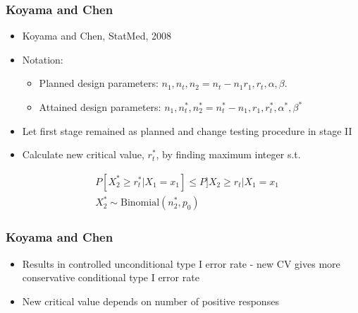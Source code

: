 \documentclass{beamer}\usepackage[]{graphicx}\usepackage[]{color}
\begin{document}
\begin{frame}
\frametitle{Koyama and Chen}
    \begin{itemize}
        \item Koyama and Chen, StatMed, 2008
        \item Notation: 
          \begin{itemize}
            \item Planned design parameters: $n_1, n_t, n_2 = n_t - n_1 r_1, r_t, \alpha, \beta$. 
            \item Attained design parameters: $n_1, n_t^\ast, n_2^\ast = n_t^\ast - n_1, r_1, r_t^\ast, \alpha^\ast, \beta^\ast$  
          \end{itemize}
        \item Let first stage remained as planned and change testing procedure in stage II%
        \item Calculate new critical value, $r_t^\ast$, by finding maximum integer s.t. 
    \end{itemize}
    \begin{equation*}
    \begin{aligned}
    &P[X_2^\ast \geq r_t^\ast \vert X_1 = x_1] \leq P]X_2 \geq r_t \vert X_1 = x_1\\
    &X_2^\ast \sim \mbox{Binomial}(n_2^\ast, p_0)
    \end{aligned}
    \end{equation*}
\end{frame}

\begin{frame}
\frametitle{Koyama and Chen}
    \begin{itemize}
        \item Results in controlled unconditional type I error rate - new CV gives more conservative conditional type I error rate
        \item New critical value depends on number of positive responses
    \end{itemize}
\end{frame}
\end{document}
